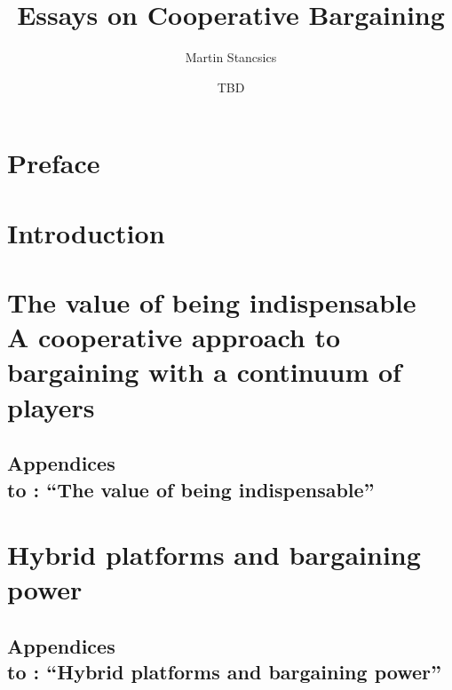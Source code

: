 \documentclass[a4paper,11pt,twoside,openright]{report}
\title{Essays on Cooperative Bargaining}
\author{Martin Stancsics}
\date{TBD}
\begin{document}




\chapter*{Preface}


\tableofcontents
{}

\chapter{Introduction}
\label{ch:introduction}
\setcounter{page}{1}



\chapter[The value of being indispensable]{%
    The value of being indispensable\\\vspace{0.4cm}%
    \large{A cooperative approach to bargaining with a continuum of players}%
}
\label{ch:theory}

\begin{subappendices}
    \chapter*{
        Appendices\\\vspace{0.4cm}%
        \large{to : ``The value of being indispensable''}
    }
    
\end{subappendices}

\chapter{Hybrid platforms and bargaining power}
\label{ch:application}

\begin{subappendices}
    \chapter*{
        Appendices\\\vspace{0.4cm}%
        \large{to : ``Hybrid platforms and bargaining power''}
    }
    
\end{subappendices}
\end{document}
